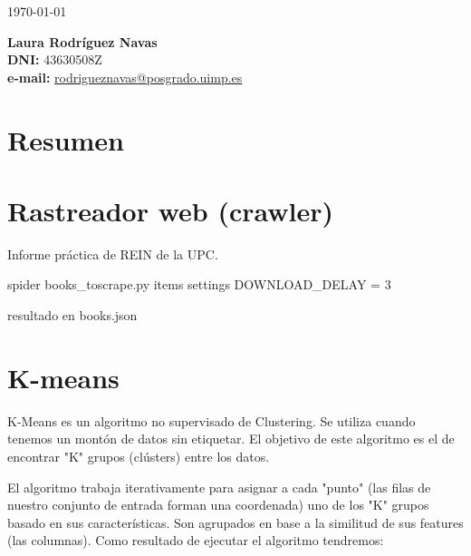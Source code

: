 \documentclass{uimppracticas}
\begin{document}
	
\frontmatter


\begin{center}
\large \today
\end{center}

\vspace{40mm}

\begin{flushright}
 	{\bf Laura Rodríguez Navas}\\
 	\textbf{DNI:} 43630508Z\\
 	\textbf{e-mail:} \href{rodrigueznavas@posgrado.uimp.es}{rodrigueznavas@posgrado.uimp.es}
\end{flushright}

\newpage

\tableofcontents

\newpage

\mainmatter

\setlength\parskip{2.5ex}

\section{Resumen}

\section{Rastreador web (crawler)}

Informe práctica de REIN de la UPC.

spider books\_toscrape.py
items
settings DOWNLOAD\_DELAY = 3

resultado en books.json


\section{K-means} 
K-Means es un algoritmo no supervisado de Clustering. Se utiliza cuando tenemos un montón de datos sin etiquetar. El objetivo de este algoritmo es el de encontrar "K" grupos (clústers) entre los datos.

El algoritmo trabaja iterativamente para asignar a cada "punto" (las filas de nuestro conjunto de entrada forman una coordenada) uno de los "K" grupos basado en sus características. Son agrupados en base a la similitud de sus features (las columnas). Como resultado de ejecutar el algoritmo tendremos:
\end{document}
